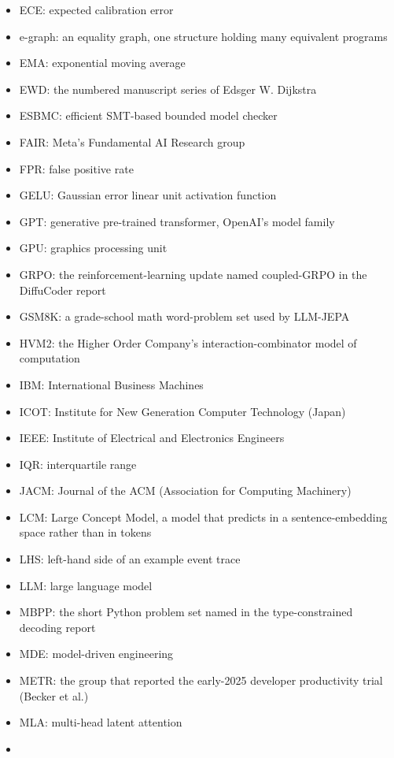 \documentclass[10pt,letterpaper]{article}
\begin{document}
\begin{itemize}
  EBM: energy-based model
\item
  ECE: expected calibration error
\item
  e-graph: an equality graph, one structure holding many equivalent
  programs
\item
  EMA: exponential moving average
\item
  EWD: the numbered manuscript series of Edsger W. Dijkstra
\item
  ESBMC: efficient SMT-based bounded model checker
\item
  FAIR: Meta's Fundamental AI Research group
\item
  FPR: false positive rate
\item
  GELU: Gaussian error linear unit activation function
\item
  GPT: generative pre-trained transformer, OpenAI's model family
\item
  GPU: graphics processing unit
\item
  GRPO: the reinforcement-learning update named coupled-GRPO in the
  DiffuCoder report
\item
  GSM8K: a grade-school math word-problem set used by LLM-JEPA
\item
  HVM2: the Higher Order Company's interaction-combinator model of
  computation
\item
  IBM: International Business Machines
\item
  ICOT: Institute for New Generation Computer Technology (Japan)
\item
  IEEE: Institute of Electrical and Electronics Engineers
\item
  IQR: interquartile range
\item
  JACM: Journal of the ACM (Association for Computing Machinery)
\item
  LCM: Large Concept Model, a model that predicts in a
  sentence-embedding space rather than in tokens
\item
  LHS: left-hand side of an example event trace
\item
  LLM: large language model
\item
  MBPP: the short Python problem set named in the type-constrained
  decoding report
\item
  MDE: model-driven engineering
\item
  METR: the group that reported the early-2025 developer productivity
  trial (Becker et al.)
\item
  MLA: multi-head latent attention
\item

\end{itemize}
\end{document}
